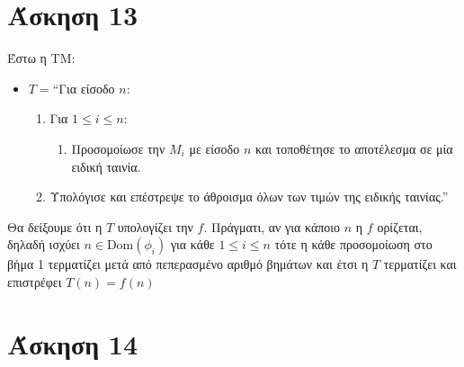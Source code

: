 \documentclass[a4paper, oneside, 11pt]{article}
\theoremstyle{definition}
\begin{document}

\section*{Άσκηση 13}

Έστω η ΤΜ:

\begin{itemize}
\item $T = $``Για είσοδο $n$:
      \begin{enumerate}
      \item Για $1 \leq i \leq n$:
            \begin{enumerate}
            \item Προσομοίωσε την $M_i$ με είσοδο $n$ και τοποθέτησε το αποτέλεσμα σε
                  μία ειδική ταινία.
            \end{enumerate}
      \item Υπολόγισε και επέστρεψε το άθροισμα όλων των τιμών της ειδικής ταινίας.''
      \end{enumerate}
\end{itemize}

Θα δείξουμε ότι η $T$ υπολογίζει την $f$. Πράγματι, αν για κάποιο $n$ η $f$ ορίζεται,
δηλαδή ισχύει
$n \in \text{Dom}(\phi_i)$ για κάθε $1 \leq i \leq n$ τότε η 
κάθε προσομοίωση στο βήμα 1 τερματίζει μετά από πεπερασμένο αριθμό βημάτων και έτσι η
$T$ τερματίζει και επιστρέφει $T(n) = f(n)$

\section*{Άσκηση 14}
\end{document}
